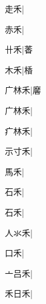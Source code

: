\begin{multicols}{2}
{{\cjk{}{\cnsym{}　}走禾}\mktsJzrVerticalBar{}{\cjk{}{\cnsym{}　}{\cnsym{}　}{\cnsym{}　}}|{}\par
{\cjk{}{\cnsym{}　}赤禾}\mktsJzrVerticalBar{}{\cjk{}{\cnsym{}　}{\cnsym{}　}{\cnsym{}　}}|{}\par
{\cjk{}{\cnsym{}　}卄禾}\mktsJzrVerticalBar{}{\cjk{}{\cnsym{}　}{\cnsym{}　}{\cnsym{}　}}|{\cjk{}萫}\par
{\cjk{}{\cnsym{}　}木禾}\mktsJzrVerticalBar{}{\cjk{}{\cnsym{}　}{\cnsym{}　}{\cnsym{}　}}|{\cjk{}楿}\par
{\cjk{}广林禾}\mktsJzrVerticalBar{}{\cjk{}{\cnsym{}　}{\cnsym{}　}{\cnsym{}　}}|{\cjk{}黁}\par
{\cjk{}广林禾}|{}\par
{\cjk{}疒林禾}\mktsJzrVerticalBar{}{\cjk{}{\cnsym{}　}{\cnsym{}　}{\cnsym{}　}}|{}\par
{\cjk{}示寸禾}|{}\par
{\cjk{}{\cnsym{}　}馬禾}\mktsJzrVerticalBar{}{\cjk{}{\cnsym{}　}{\cnsym{}　}{\cnsym{}　}}|{}\par
{\cjk{}{\cnsym{}　}石禾}\mktsJzrVerticalBar{}{\cjk{}{\cnsym{}　}{\cnsym{}　}{\cnsym{}　}}|{}\par
{\cjk{}{\cnsym{}　}石禾}\mktsJzrVerticalBar{}{\cjk{}{\cnsym{}　}{\cnsym{}　}{\cnsym{}　}}|{}\par
{\cjk{}人氺禾}|{}\par
{\cjk{}{\cnsym{}　}口禾}\mktsJzrVerticalBar{}{\cjk{}{\cnsym{}　}{\cnsym{}　}{\cnsym{}　}}|{}\par
{\cjk{}亠吕禾}\mktsJzrVerticalBar{}{\cjk{}{\cnsym{}　}{\cnsym{}　}{\cnsym{}　}}|{}\par
{\cjk{}禾日禾}\mktsJzrVerticalBar{}{\cjk{}{\cnsym{}　}{\cnsym{}　}{\cnsym{}　}}|{}\par
}
\end{multicols}
